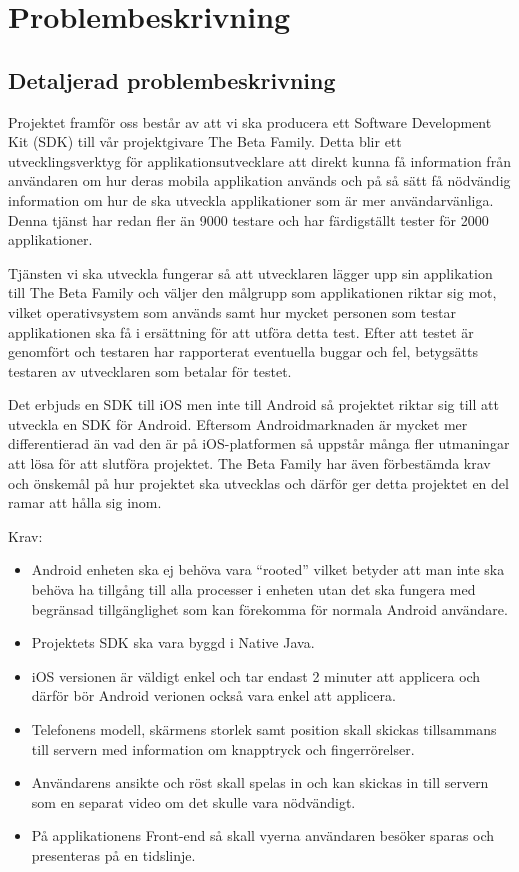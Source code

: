 \section{Problembeskrivning}
\subsection{Detaljerad problembeskrivning}
Projektet framför oss består av att vi ska producera ett Software Development Kit (SDK) till vår projektgivare The Beta Family. Detta blir ett utvecklingsverktyg för applikationsutvecklare att direkt kunna få information från användaren om hur deras mobila applikation används och på så sätt få nödvändig information om hur de ska utveckla applikationer som är mer användarvänliga. Denna tjänst har redan fler än 9000 testare och har färdigställt tester för 2000 applikationer.


Tjänsten vi ska utveckla fungerar så att utvecklaren lägger upp sin applikation till The Beta Family och väljer den målgrupp som applikationen riktar sig mot, vilket operativsystem som används samt hur mycket personen som testar applikationen ska få i ersättning för att utföra detta test. Efter att testet är genomfört och testaren har rapporterat eventuella buggar och fel, betygsätts testaren av utvecklaren som betalar för testet.


Det erbjuds en SDK till iOS men inte till Android så projektet riktar sig till att utveckla en SDK för Android. Eftersom Androidmarknaden är mycket mer differentierad än vad den är på iOS-platformen så uppstår många fler utmaningar att lösa för att slutföra projektet. The Beta Family har även förbestämda krav och önskemål på hur projektet ska utvecklas och därför ger detta projektet en del ramar att hålla sig inom.


Krav:

\begin{itemize}
	\item Android enheten ska ej behöva vara “rooted” vilket betyder att man inte ska behöva ha tillgång till alla processer i enheten utan det ska fungera med begränsad tillgänglighet som kan 	förekomma för normala Android användare.
	\item Projektets SDK ska vara byggd i Native Java.
	\item iOS versionen är väldigt enkel och tar endast 2 minuter att applicera och därför bör Android verionen också vara enkel att applicera.
	\item Telefonens modell, skärmens storlek samt position skall skickas tillsammans till servern med information om knapptryck och fingerrörelser.
	\item Användarens ansikte och röst skall spelas in och kan skickas in till servern som en separat video om det skulle vara nödvändigt.
	\item På applikationens Front-end så skall vyerna användaren besöker sparas och presenteras på en tidslinje.
\end{itemize}

